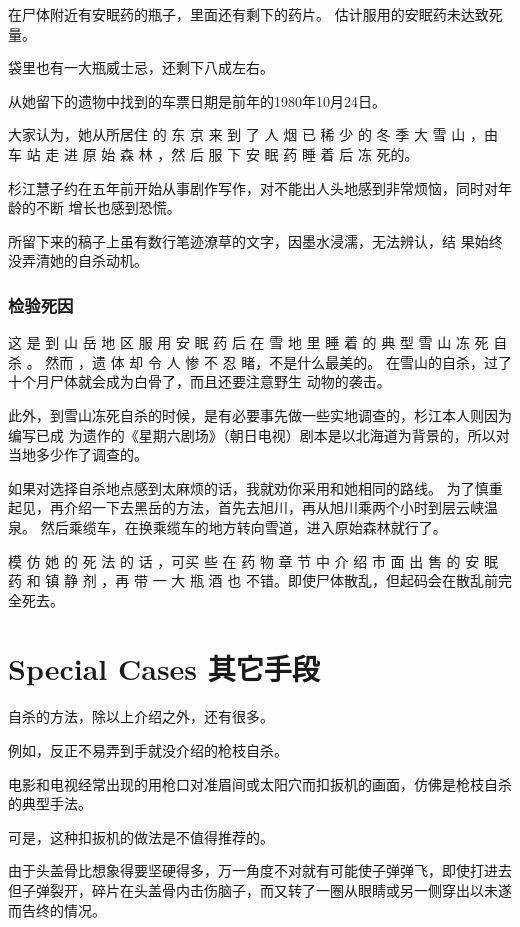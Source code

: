 \documentclass[UTF8]{ctexart}
\begin{document}
在尸体附近有安眠药的瓶子，里面还有剩下的药片。
估计服用的安眠药未达致死量。

袋里也有一大瓶威士忌，还剩下八成左右。

从她留下的遗物中找到的车票日期是前年的1980年10月24日。

大家认为，她从所居住 的 东 京 来 到 了 人 烟 已 稀 少 的 冬 季 大 雪 山 ，由 车 站 走 进 原 始 森 林 ，然 后 服 下 安 眠 药 睡 着 后 冻 死的。

杉江慧子约在五年前开始从事剧作写作，对不能出人头地感到非常烦恼，同时对年龄的不断 增长也感到恐慌。

所留下来的稿子上虽有数行笔迹潦草的文字，因墨水浸濡，无法辨认，结 果始终没弄清她的自杀动机。

\subsubsection*{检验死因}

这 是 到 山 岳 地 区 服 用 安 眠 药 后 在 雪 地 里 睡 着 的 典 型 雪 山 冻 死 自 杀 。
然而 ，遗 体 却 令 人 惨 不 忍 睹，不是什么最美的。
在雪山的自杀，过了十个月尸体就会成为白骨了，而且还要注意野生 动物的袭击。

此外，到雪山冻死自杀的时候，是有必要事先做一些实地调查的，杉江本人则因为编写已成 为遗作的《星期六剧场》（朝日电视）剧本是以北海道为背景的，所以对当地多少作了调查的。

如果对选择自杀地点感到太麻烦的话，我就劝你采用和她相同的路线。
为了慎重起见，再介绍一下去黑岳的方法，首先去旭川，再从旭川乘两个小时到层云峡温泉。
然后乘缆车，在换乘缆车的地方转向雪道，进入原始森林就行了。

模 仿 她 的 死 法 的 话 ，可买 些 在 药 物 章 节 中 介 绍 市 面 出 售 的 安 眠 药 和 镇 静 剂 ，再 带 一 大 瓶 酒 也 不错。即使尸体散乱，但起码会在散乱前完全死去。



\newpage

\section{Special Cases 其它手段}

自杀的方法，除以上介绍之外，还有很多。

例如，反正不易弄到手就没介绍的枪枝自杀。

电影和电视经常出现的用枪口对准眉间或太阳穴而扣扳机的画面，仿佛是枪枝自杀的典型手法。

可是，这种扣扳机的做法是不值得推荐的。

由于头盖骨比想象得要坚硬得多，万一角度不对就有可能使子弹弹飞，即使打进去但子弹裂开，碎片在头盖骨内击伤脑子，而又转了一圈从眼睛或另一侧穿出以未遂而告终的情况。
\end{document}
